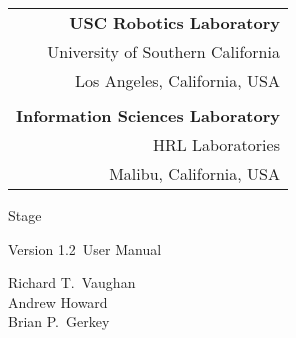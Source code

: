 \documentclass[11pt]{report}
\def\VERSION {1.2}
\begin{document}
\setcounter{page}{0}

\titlepage


\begin{flushright}
   \begin{tabular}{r}
     {\bf USC Robotics Laboratory}\\
     University of Southern California\\
     Los Angeles, California, USA\\
     \vspace*{2em}\\
    {\bf Information Sciences Laboratory}\\
     HRL Laboratories\\
     Malibu, California, USA\\
   \end{tabular}
\end{flushright}

  \vspace{5cm}	
  \centerline{ \Huge{Stage}}
  \vspace{0.5cm}
  \centerline{\large{Version \VERSION\ User Manual}}
  \vspace{2cm}
  \centerline{\large Richard T.~Vaughan \\ Andrew Howard \\ Brian P.~Gerkey}
  \vspace{1cm}
\end{document}
